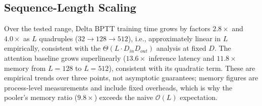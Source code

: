 \documentclass[10pt,journal,compsoc]{IEEEtran}
\begin{document}
\subsection{Sequence-Length Scaling}
\begin{table}[t!]
\caption{Empirical scaling across sequence lengths $L \in \{32, 128, 512\}$ ($D_{model}=256$).}
\label{tab:seq_length_scaling}
\begin{center}
\end{center}
\end{table}

Over the tested range, Delta BPTT training time grows by factors $2.8\times$ and $4.0\times$ as $L$ quadruples ($32\to128\to512$), i.e., approximately linear in $L$ empirically, consistent with the $\Theta(L \cdot D_{in} D_{out})$ analysis at fixed $D$. The attention baseline grows superlinearly ($13.6\times$ inference latency and $11.8\times$ memory from $L{=}128$ to $L{=}512$), consistent with its quadratic term. These are empirical trends over three points, not asymptotic guarantees; memory figures are process-level measurements and include fixed overheads, which is why the pooler's memory ratio ($9.8\times$) exceeds the naive $\mathcal{O}(L)$ expectation.
\end{document}
